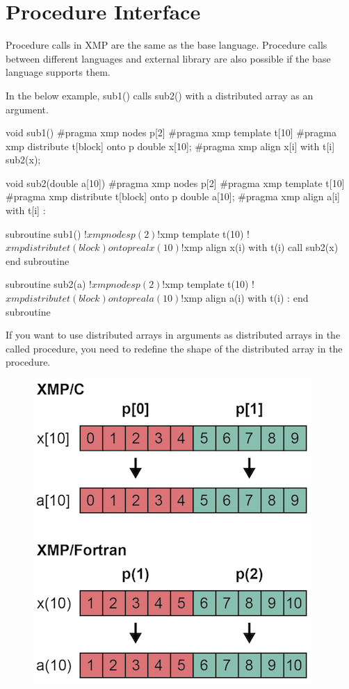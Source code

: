 \section{Procedure Interface}

Procedure calls in XMP are the same as the base language. Procedure
calls between different languages and external library are also possible
if the base language supports them. 

In the below example, sub1() calls sub2() with a distributed array as an
argument.

\begin{XCexample}
void sub1(){
#pragma xmp nodes p[2]
#pragma xmp template t[10]
#pragma xmp distribute t[block] onto p
  double x[10];
#pragma xmp align x[i] with t[i]
  sub2(x);
}

void sub2(double a[10]){
#pragma xmp nodes p[2]
#pragma xmp template t[10]
#pragma xmp distribute t[block] onto p
  double a[10];
#pragma xmp align a[i] with t[i]
  :
}
\end{XCexample}

\begin{XFexample}
subroutine sub1()
!$xmp nodes p(2)
!$xmp template t(10)
!$xmp distribute t(block) onto p
  real x(10)
!$xmp align x(i) with t(i)
  call sub2(x)
end subroutine

subroutine sub2(a)
!$xmp nodes p(2)
!$xmp template t(10)
!$xmp distribute t(block) onto p
  real a(10)
!$xmp align a(i) with t(i)
  :
end subroutine
\end{XFexample}

If you want to use distributed arrays in arguments as distributed arrays
in the called procedure, you need to redefine the shape of the
distributed array in the procedure.

\begin{figure}
  \centering
  \includegraphics{figs/destributed_array.png}
\end{figure}

